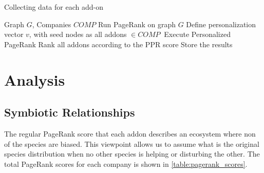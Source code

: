 \documentclass[11pt,oneside]{book}
\let\Oldsection\section
\renewcommand{\section}{\FloatBarrier\Oldsection}
\let\Oldsubsection\subsection
\renewcommand{\subsection}{\FloatBarrier\Oldsubsection}
\begin{document}
\begin{algorithm}[!t]
\caption{Collecting data for each add-on}
\label{alg:collect_addon_data}
\begin{algorithmic}[1] 
\REQUIRE Graph $G$, Companies $COMP$
\STATE Run PageRank on graph $G$
\STATE Define personalization vector $v$, with seed nodes as all addons $\in COMP\ $
\STATE Execute Personalized PageRank
\STATE Rank all addons according to the PPR score
\STATE Store the results
\ENDFOR
\end{algorithmic}
\end{algorithm}

\section{Analysis}
\subsection{Symbiotic Relationships}
\label{sec:symb_relations}
The regular PageRank score that each addon describes an ecosystem where non of the species are biased. This viewpoint allows us to assume what is the original species distribution when no other species is helping or disturbing the other. The total PageRank scores for each company is shown in \autoref{table:pagerank_scores}.
\end{document}
